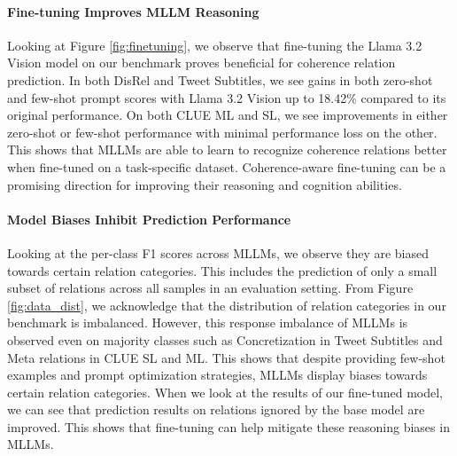 \paragraph{Fine-tuning Improves MLLM Reasoning}
Looking at Figure \ref{fig:finetuning}, we observe that fine-tuning the Llama 3.2 Vision model on our benchmark proves beneficial for coherence relation prediction. In both DisRel and Tweet Subtitles, we see gains in both zero-shot and few-shot prompt scores with Llama 3.2 Vision up to 18.42\% compared to its original performance. On both CLUE ML and SL, we see improvements in either zero-shot or few-shot performance with minimal performance loss on the other. This shows that MLLMs are able to learn to recognize coherence relations better when fine-tuned on a task-specific dataset. Coherence-aware fine-tuning can be a promising direction for improving their reasoning and cognition abilities.

\paragraph{Model Biases Inhibit Prediction Performance}
Looking at the per-class F1 scores across MLLMs, we observe they are biased towards certain relation categories. This includes the prediction of only a small subset of relations across all samples in an evaluation setting. From Figure \ref{fig:data_dist}, we acknowledge that the distribution of relation categories in our benchmark is imbalanced. However, this response imbalance of MLLMs is observed even on majority classes such as Concretization in Tweet Subtitles and Meta relations in CLUE SL and ML. This shows that despite providing few-shot examples and prompt optimization strategies, MLLMs display biases towards certain relation categories. When we look at the results of our fine-tuned model, we can see that prediction results on relations ignored by the base model are improved. This shows that fine-tuning can help mitigate these reasoning biases in MLLMs.